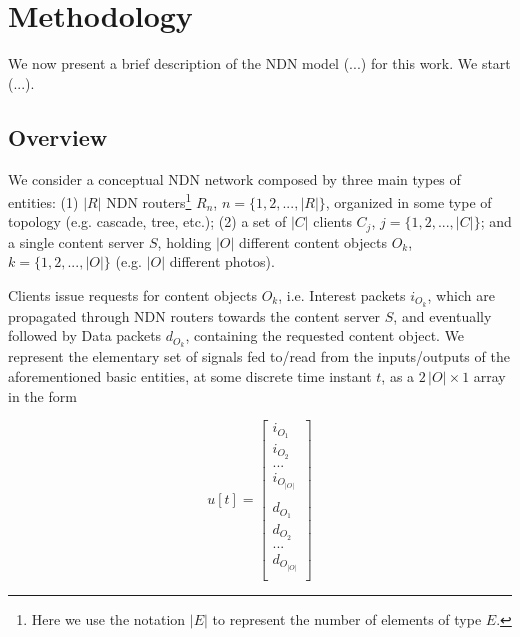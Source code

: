 \section{Methodology}
\label{sec:methodology}

We now present a brief description of the NDN model (...) for this work. We 
start (...).

\subsection{Overview}
\label{subsec:meth-overview}

We consider a conceptual NDN network composed by three main types of 
entities: (1) 
$|R|$ NDN routers\footnote{Here we use the notation $|E|$ to 
represent the number of elements of type $E$.} $R_n$, $n = \{1,2,...,|R|\}$, 
organized in some type of topology (e.g. cascade, tree, etc.); (2) a set of 
$|C|$ clients $C_j$, $j = \{1,2,...,|C|\}$; and a single 
content server $S$, holding $|O|$ different content objects $O_k$, 
$k = \{1,2,...,|O|\}$ (e.g. $|O|$ different photos).\shortvertbreak

Clients issue requests for content objects $O_k$, i.e. Interest packets $i_{O_k}$, which 
are propagated through NDN routers towards the content server $S$, and 
eventually followed by Data packets 
$d_{O_k}$, containing the requested content object. We represent the 
elementary set of signals fed to\slash read from the inputs\slash outputs of the 
aforementioned basic 
entities, at some discrete time instant $t$, as a $2\,|O| \times 1 $ array in the form

\begin{equation}
    u[t] = \begin{bmatrix}  i_{O_1}         \\ 
                            i_{O_2}         \\ 
                             ...            \\ 
                            i_{O_{|O|}}     \\ 
                                            \\ 
                            d_{O_1}         \\ 
                            d_{O_2}         \\ 
                             ...            \\ 
                            d_{O_{|O|}}     \\ \end{bmatrix}
    \label{eq:signal}
\end{equation}\shortvertbreak

